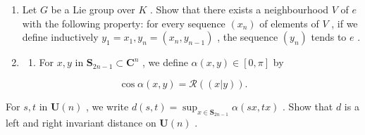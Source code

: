 \begin{enumerate}
\def\labelenumi{\arabic{enumi}.}
\setcounter{enumi}{9}
\item
  Let \(G\) be a Lie group over \(K\) . Show that there exists a neighbourhood \(V\) of \(e\) with the following property: for every sequence \((x_{n})\) of elements of \(V\) , if we define inductively \(y_{1} = x_{1}, y_{n} = (x_{n}, y_{n-1})\) , the sequence \((y_{n})\) tends to \(e\) .
\item
  \begin{enumerate}
  \def\labelenumii{(\alph{enumii})}
  \tightlist
  \item
    For \(x, y\) in \(\mathbf{S}_{2n-1} \subset \mathbf{C}^n\) , we define \(\alpha(x, y) \in [0, \pi]\) by
  \end{enumerate}
\end{enumerate}

\[
\cos \alpha (x, y) = \mathscr {R} ((x | y)).
\]

For \(s, t\) in \(\mathbf{U}(n)\) , we write \(d(s, t) = \sup_{x \in \mathbf{S}_{2n-1}} \alpha(sx, tx)\) . Show that \(d\) is a left and right invariant distance on \(\mathbf{U}(n)\) .

